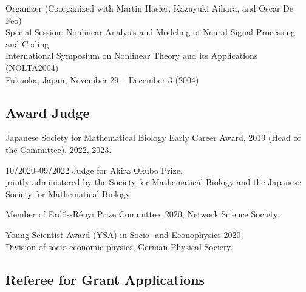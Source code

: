 \documentclass[11pt,letter]{article}
\renewenvironment{itemize}{
  \begin{list}{}{
    \setlength{\leftmargin}{1.5em}
    \setlength{\itemsep}{0.25em}
    \setlength{\parskip}{0pt}
    \setlength{\parsep}{0.25em}
  }
}{
  \end{list}
}
\begin{document}
\begin{itemize}
\item Organizer (Coorganized with Martin Hasler, Kazuyuki Aihara, and Oscar De Feo)\\
Special Session: Nonlinear Analysis and Modeling of Neural Signal Processing and Coding\\
International Symposium on Nonlinear Theory and its Applications (NOLTA2004)\\
Fukuoka, Japan, November 29 -- December 3 (2004)

\end{itemize}

\subsection*{\bf \normalsize Award Judge}

\begin{itemize}

\item
Japanese Society for Mathematical Biology Early Career Award, 2019 (Head of the Committee), 2022, 2023.

\item 10/2020--09/2022 Judge for Akira Okubo Prize,\\
jointly administered by the Society for Mathematical Biology and the Japanese Society for Mathematical Biology.

%

\item Member of Erd\H{o}s-R\'{e}nyi Prize Committee, 2020, Network Science Society.

%
\item %
Young Scientist Award (YSA) in Socio- and Econophysics 2020,\\
Division of socio-economic physics, German Physical Society.


\end{itemize}

\subsection*{\bf \normalsize Referee for Grant Applications}
\end{document}
